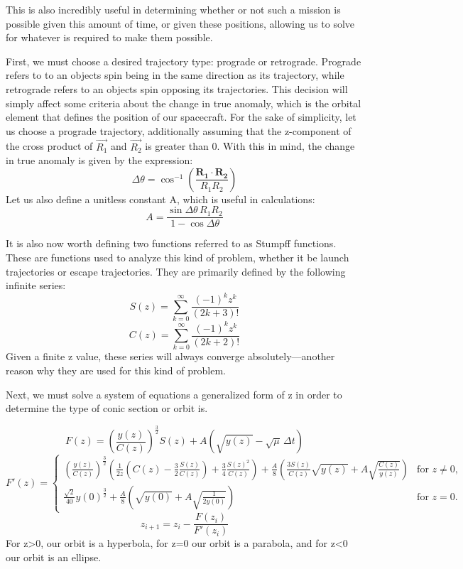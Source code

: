 \documentclass{article}
\numberwithin{figure}{section}
\begin{document}
This is also incredibly useful in determining whether or not such a mission is possible given this amount of time, or given these positions, allowing us to solve for whatever is required to make them possible.

First, we must choose a desired trajectory type: prograde or retrograde. Prograde refers to to an objects spin being in the same direction as its trajectory, while retrograde refers to an objects spin opposing its trajectories. This decision will simply affect some criteria about the change in true anomaly, which is the orbital element that defines the position of our spacecraft. For the sake of simplicity, let us choose a prograde trajectory, additionally assuming that the z-component of the cross product of \(\vec{R_1}\) and \(\vec{R_2}\) is greater than 0. With this in mind, the change in true anomaly is given by the expression:
\[
\Delta \theta = \cos^{-1} \left( \frac{\mathbf{R_1} \cdot \mathbf{R_2}}{R_1 R_2} \right)
\]
Let us also define a unitless constant A, which is useful in calculations:
\[
A = \frac{\sin \Delta\theta \, R_1 R_2}{1 - \cos \Delta\theta}
\]

It is also now worth defining two functions referred to as Stumpff functions. These are functions used to analyze this kind of problem, whether it be launch trajectories or escape trajectories. They are primarily defined by the following infinite series:
\[
S(z) = \sum_{k=0}^{\infty} \frac{(-1)^k z^k}{(2k + 3)!}
\]
\[
C(z) = \sum_{k=0}^{\infty} \frac{(-1)^k z^k}{(2k + 2)!}
\]
Given a finite z value, these series will always converge absolutely---another reason why they are used for this kind of problem.

Next, we must solve a system of equations a generalized form of z in order to determine the type of conic section or orbit is.

\[
F(z) = \left( \frac{y(z)}{C(z)} \right)^{\frac{3}{2}} S(z) + A \left( \sqrt{y(z)} - \sqrt{\mu} \,\Delta t \right)
\]
\[
F'(z) = 
\begin{cases} 
\left( \frac{y(z)}{C(z)} \right)^{\frac{3}{2}} \left( \frac{1}{2z} \left( C(z) - \frac{3}{2} \frac{S(z)}{C(z)} \right) + \frac{3}{4} \frac{S(z)^2}{C(z)}\right) + \frac{A}{8} \left( \frac{3 S(z)}{C(z)} \sqrt{y(z)} + A \sqrt{\frac{C(z)}{y(z)}} \right) & \text{for } z \neq 0, \\
\frac{\sqrt{2}}{40} y(0)^{\frac{3}{2}} + \frac{A}{8} \left( \sqrt{y(0)} + A \sqrt{\frac{1}{2y(0)}} \right) & \text{for } z = 0.
\end{cases}
\]
\[
z_{i+1} = z_i - \frac{F(z_i)}{F'(z_i)}
\]
For z>0, our orbit is a hyperbola, for z=0 our orbit is a parabola, and for z<0 our orbit is an ellipse.
\end{document}

